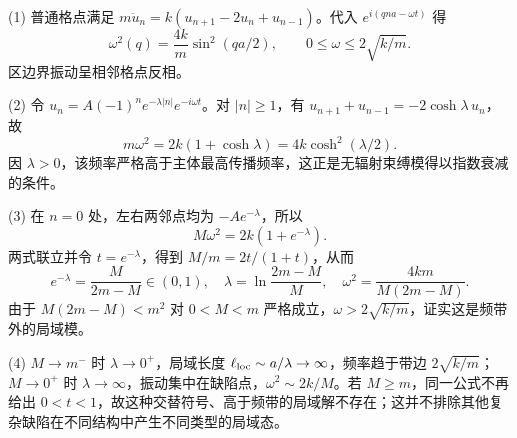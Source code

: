 (1) 普通格点满足 \(m\ddot u_n=k(u_{n+1}-2u_n+u_{n-1})\)。代入 \(e^{i(qna-\omega t)}\) 得
\[
\omega^2(q)=\frac{4k}{m}\sin^2(qa/2),\qquad 0\le\omega\le 2\sqrt{k/m}.
\]
区边界振动呈相邻格点反相。

(2) 令 \(u_n=A(-1)^n e^{-\lambda|n|}e^{-i\omega t}\)。对 \(|n|\ge1\)，有 \(u_{n+1}+u_{n-1}=-2\cosh\lambda\,u_n\)，故
\[
m\omega^2=2k(1+\cosh\lambda)=4k\cosh^2(\lambda/2).
\]
因 \(\lambda>0\)，该频率严格高于主体最高传播频率，这正是无辐射束缚模得以指数衰减的条件。

(3) 在 \(n=0\) 处，左右两邻点均为 \(-Ae^{-\lambda}\)，所以
\[
M\omega^2=2k(1+e^{-\lambda}).
\]
两式联立并令 \(t=e^{-\lambda}\)，得到 \(M/m=2t/(1+t)\)，从而
\[
e^{-\lambda}=\frac M{2m-M}\in(0,1),\quad
\lambda=\ln\frac{2m-M}{M},\quad
\omega^2=\frac{4km}{M(2m-M)}.
\]
由于 \(M(2m-M)<m^2\) 对 \(0<M<m\) 严格成立，\(\omega>2\sqrt{k/m}\)，证实这是频带外的局域模。

(4) \(M\to m^-\) 时 \(\lambda\to0^+\)，局域长度 \(\ell_{\rm loc}\sim a/\lambda\to\infty\)，频率趋于带边 \(2\sqrt{k/m}\)；\(M\to0^+\) 时 \(\lambda\to\infty\)，振动集中在缺陷点，\(\omega^2\sim2k/M\)。若 \(M\ge m\)，同一公式不再给出 \(0<t<1\)，故这种交替符号、高于频带的局域解不存在；这并不排除其他复杂缺陷在不同结构中产生不同类型的局域态。
